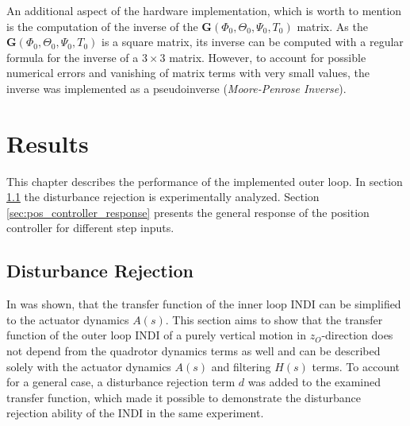 \documentclass[11pt, a4paper, twoside]{report}
\begin{document}
An additional aspect of the hardware implementation, which is worth to mention is the computation of the inverse of the $\bm{G}(\Phi_0, \Theta_0, \Psi_0, T_0)$ matrix. As the $\bm{G}(\Phi_0, \Theta_0, \Psi_0, T_0)$ is a square matrix, its inverse can be computed with a regular formula for the inverse of a $3 \times 3$ matrix. However, to account for possible numerical errors and vanishing of matrix terms with very small values, the inverse was implemented as a pseudoinverse (\textit{Moore-Penrose Inverse}).

\chapter{Results} \label{cha:results}

This chapter describes the performance of the implemented outer loop. In section \ref{sec:disturbance_rejection} the disturbance rejection is experimentally analyzed. Section \ref{sec:pos_controller_response} presents the general response of the position controller for different step inputs.

\thispagestyle{fancy}

\section{Disturbance Rejection} \label{sec:disturbance_rejection}

In \cite{Smeur1} was shown, that the transfer function of the inner loop \acrshort{INDI} can be simplified to the actuator dynamics $A(s)$. This section aims to show that the transfer function of the outer loop \acrshort{INDI} of a purely vertical motion in $z_O$-direction does not depend from the quadrotor dynamics terms as well and can be described solely with the actuator dynamics $A(s)$ and filtering $H(s)$ terms. To account for a general case, a disturbance rejection term $d$ was added to the examined transfer function, which made it possible to demonstrate the disturbance rejection ability of the \acrshort{INDI} in the same experiment.
\end{document}

